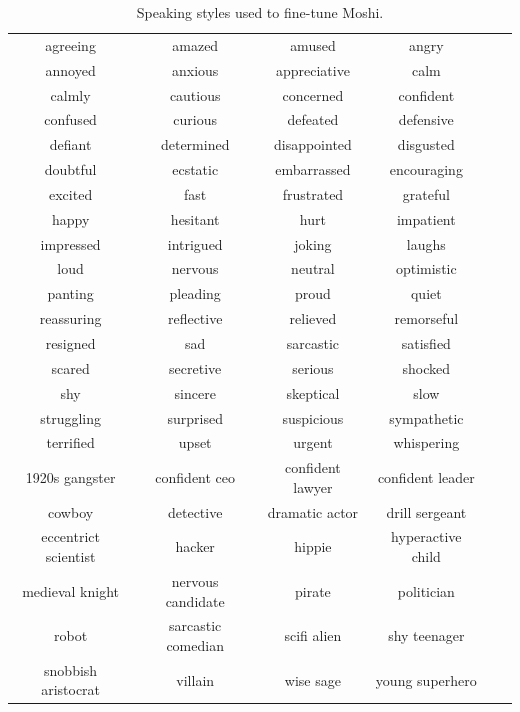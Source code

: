 \begin{table}
  \centering
  \caption{Speaking styles used to fine-tune Moshi.}
  \label{tab:list_voices}
  \begin{tabular}{cccccc}
    \toprule
agreeing & amazed & amused & angry \\
annoyed & anxious & appreciative & calm \\
calmly & cautious & concerned & confident \\
confused & curious & defeated & defensive \\
defiant & determined & disappointed & disgusted \\
doubtful & ecstatic & embarrassed & encouraging \\
excited & fast & frustrated & grateful \\
happy & hesitant & hurt & impatient \\
impressed & intrigued & joking & laughs \\
loud & nervous & neutral & optimistic \\
panting & pleading & proud & quiet \\
reassuring & reflective & relieved & remorseful \\
resigned & sad & sarcastic & satisfied \\
scared & secretive & serious & shocked \\
shy & sincere & skeptical & slow \\
struggling & surprised & suspicious & sympathetic \\
terrified & upset & urgent & whispering \\
1920s gangster & confident ceo & confident lawyer & confident leader \\
cowboy & detective & dramatic actor & drill sergeant \\
eccentrict scientist & hacker & hippie & hyperactive child \\
medieval knight & nervous candidate & pirate & politician \\
robot & sarcastic comedian & scifi alien & shy teenager \\
snobbish aristocrat & villain & wise sage & young superhero \\
    \bottomrule
  \end{tabular}
\end{table}

